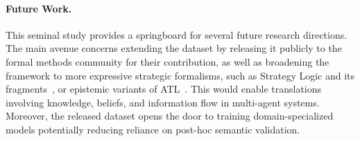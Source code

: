 
\paragraph{Future Work.}
This seminal study provides a springboard for several future research directions. The main avenue concerns extending the dataset by releasing it publicly to the formal methods community for their contribution, as well as broadening the framework to more expressive strategic formalisms, such as Strategy Logic and its fragments~\cite{DBLP:journals/tocl/MogaveroMPV14,DBLP:conf/aaai/CermakLM15,DBLP:conf/ijcai/BelardinelliJKM19}, or epistemic variants of ATL~\cite{DBLP:journals/fuin/JamrogaH04,aminof2016prompt,jamroga2017reasoning}. This would enable translations involving knowledge, beliefs, and information flow in multi-agent systems. Moreover, the released dataset opens the door to training domain-specialized models potentially reducing reliance on post-hoc semantic validation.

